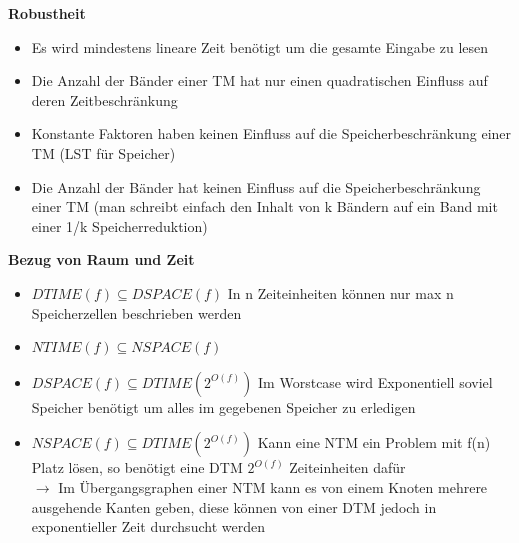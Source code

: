\documentclass[12pt,a4paper]{article}
\begin{document}
\textbf{Robustheit}
\begin{itemize}
\item Es wird mindestens lineare Zeit benötigt um die gesamte Eingabe zu lesen
\item Die Anzahl der Bänder einer TM hat nur einen quadratischen Einfluss auf deren Zeitbeschränkung
\item Konstante Faktoren haben keinen Einfluss auf die Speicherbeschränkung einer TM (LST für Speicher)
\item Die Anzahl der Bänder hat keinen Einfluss auf die Speicherbeschränkung einer TM (man schreibt einfach den Inhalt von k Bändern auf ein Band mit einer 1/k Speicherreduktion)
\end{itemize}

\textbf{Bezug von Raum und Zeit}\\

\begin{itemize}
\item $DTIME(f) \subseteq DSPACE(f)$ In n Zeiteinheiten können nur max n Speicherzellen beschrieben werden
\item $NTIME(f) \subseteq NSPACE(f)$
\item $DSPACE(f) \subseteq DTIME(2^{O(f)})$ Im Worstcase wird Exponentiell soviel Speicher benötigt um alles im gegebenen Speicher zu erledigen
\item $NSPACE(f) \subseteq DTIME(2^{O(f)})$ Kann eine NTM ein Problem mit f(n) Platz lösen, so benötigt eine DTM $2^{O(f)}$ Zeiteinheiten dafür\\

\textbf{$\rightarrow$}
Im Übergangsgraphen einer NTM kann es von einem Knoten mehrere ausgehende Kanten geben, diese können von einer DTM jedoch in exponentieller Zeit durchsucht werden
\end{itemize}
\end{document}
